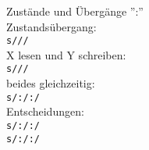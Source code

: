 \documentclass[aspectratio=169,usenames,dvipsnames]{beamer}
\begin{document}
\begin{frame}{ Zust\"ande und \"Uberg\"ange }
	\hspace{12em}
	'':''\\\pause
	\bigskip	
	Zustands\"ubergang:\\
	\hspace{15em}
	\texttt{s/\only<3->/\only<3->/}
	\\\pause\pause
	X lesen und Y schreiben:\\
	\hspace{15em}
	\texttt{s/\only<5->/\only<5->/}
	\\\pause\pause
	beides gleichzeitig:\\
	\hspace{15em}
	\texttt{s/\only<7->:\only<8->/\only<7->:\only<8->/}
	\\\pause\pause\pause
	Entscheidungen:\\
	\hspace{15em}
	\texttt{s/\only<11->:\only<10->/\only<11->:\only<10->/}\\
	\hspace{15em}
	\texttt{s/\only<11->:\only<10->/\only<11->:\only<10->/}
	\\\pause\pause
\end{frame}
\end{document}
